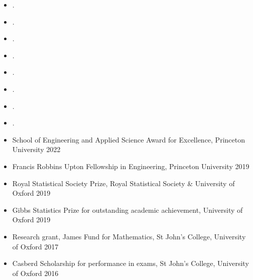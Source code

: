 \documentclass[
  date,
  number,
]{wgu-cv}
\begin{document}
\begin{itemize}
  \item {}.
  \item {}.
\end{itemize}

\begin{itemize}
  \item {}.
\end{itemize}

\begin{itemize}
  \item {}.
  \item {}.
  \item {}.
\end{itemize}

\begin{itemize}
  \item {}.
  \item {}.
\end{itemize}

\vspace*{-4mm}


\vspace*{-2mm}

\begin{itemize}
  \item School of Engineering and Applied Science Award for Excellence,
    Princeton University
    \hfill 2022%
  \item Francis Robbins Upton Fellowship in Engineering,
    Princeton University
    \hfill 2019%
  \item Royal Statistical Society Prize,
    Royal Statistical Society \& University of Oxford
    \hfill 2019%
  \item Gibbs Statistics Prize for outstanding academic achievement,
    University of Oxford
    \hfill 2019%
  \item Research grant, James Fund for Mathematics,
    St John's College, University of Oxford
    \hfill 2017%
  \item Casberd Scholarship for performance in exams,
    St John's College, University of Oxford
    \hfill 2016%
\end{itemize}
\end{document}
